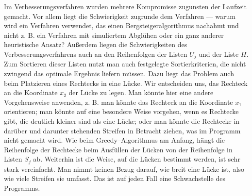 Im Verbesserungsverfahren wurden mehrere Kompromisse zugunsten der Laufzeit gemacht.
Vor allem liegt die Schwierigkeit zugrunde dem Verfahren --- warum wird ein Verfahren verwendet, das
einen Bergsteigeralgorithmus nachahmt 
und nicht z. B. ein Verfahren mit simuliertem Abglühen oder ein ganz anderer heuristische Ansatz?
Außerdem liegen die Schwierigkeiten des Verbesserungsverfahrens auch an
den Reihenfolgen der Listen $U_j$ und der Liste $H$.
Zum Sortieren dieser Listen nutzt man auch festgelegte Sortierkriterien,
die nicht zwingend das optimale Ergebnis liefern müssen.
Dazu liegt das Problem auch beim Platzieren eines Rechtecks in eine Lücke. 
Wir entscheiden uns, das Rechteck an die Koordinate $x_2$ der Lücke zu legen.
Man könnte hier eine andere Vorgehensweise anwenden, z. B. man könnte das
Rechteck an die Koordinate $x_1$ orientieren; man könnte auf eine besondere
Weise vorgehen, wenn es Rechtecke gibt, die deutlich kleiner sind als eine Lücke; oder
man könnte die Rechtecke in darüber und darunter stehenden Streifen in Betracht ziehen, 
was im Programm nicht gemacht wird.
Wie beim Greedy--Algorithmus am Anfang, hängt die Reihenfolge der Rechtecke 
beim Ausfüllen der Lücken von der Reihenfolge in Listen $S_j$ ab. 
Weiterhin ist die Weise, auf die Lücken bestimmt werden, ist sehr stark vereinfacht. 
Man nimmt keinen Bezug darauf, wie breit eine Lücke ist, also wie viele Streifen sie umfasst.
Das ist auf jeden Fall eine Schwachstelle des Programms.